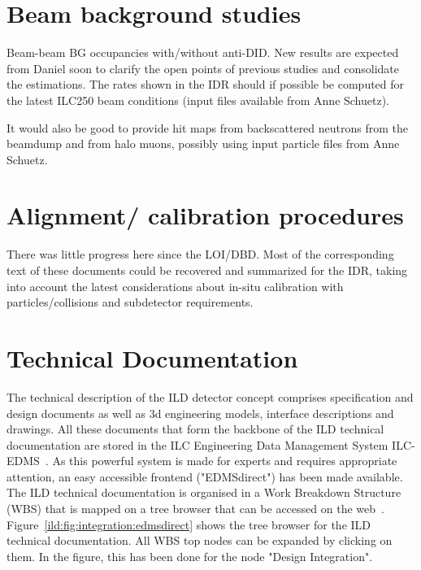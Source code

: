 \vspace{2cm}

\section{Beam background studies}

Beam-beam BG occupancies with/without anti-DID. New results are expected from Daniel soon to clarify the open points of previous studies and consolidate the estimations. The rates shown in the IDR should if possible be computed for the latest ILC250 beam conditions (input files available from Anne Schuetz).

It would also be good to provide hit maps from backscattered neutrons from the beamdump and from halo muons, possibly using input particle files from Anne Schuetz.

\vspace{2cm}

\section{Alignment/ calibration procedures}

There was little progress here since the LOI/DBD. Most of the corresponding text of these documents could be recovered and summarized for the IDR, taking into account the latest considerations about in-situ calibration with particles/collisions and subdetector requirements.

\vspace{2cm}

\section{Technical Documentation}

The technical description of the ILD detector concept comprises specification and design documents as well as 3d engineering models, interface descriptions and drawings. All these documents that form the backbone of the ILD technical documentation are stored in the ILC Engineering Data Management System ILC-EDMS~\cite{ild:bib:edms}. As this powerful system is made for experts and requires appropriate attention, an easy accessible frontend ("EDMSdirect") has been made available. The ILD technical documentation is organised in a Work Breakdown Structure (WBS) that is mapped on a tree browser that can be accessed on the web~\cite{ild:bib:edmsdirect}. Figure~\ref{ild:fig:integration:edmsdirect} shows the tree browser for the ILD technical documentation. All WBS top nodes can be expanded by clicking on them. In the figure, this has been done for the node "Design Integration".


